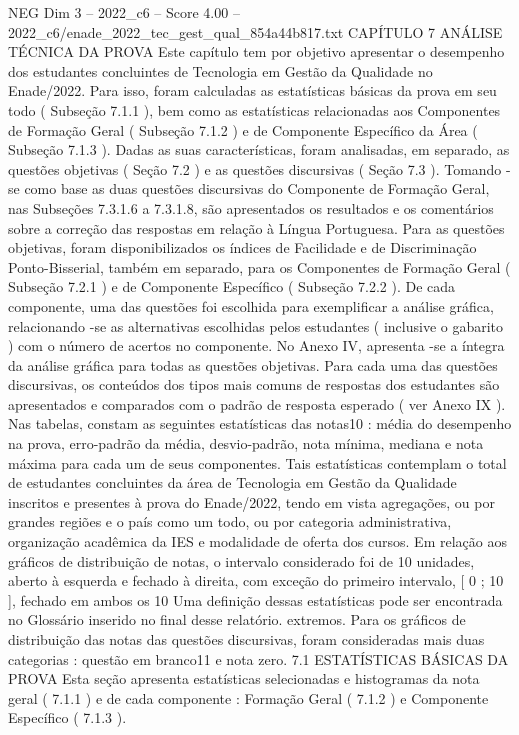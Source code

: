 \begin{textsample}{NEG Dim 3 – 2022\_c6 – Score 4.00 – 2022\_c6/enade\_2022\_tec\_gest\_qual\_854a44b817.txt}  \label{ex:f3_neg_256}
CAPÍTULO 7 ANÁLISE TÉCNICA DA PROVA Este capítulo tem por objetivo apresentar o desempenho dos estudantes concluintes de Tecnologia em Gestão da Qualidade no Enade/2022.
Para isso, foram calculadas as estatísticas básicas da prova em seu todo ( Subseção 7.1.1 ), bem como as estatísticas relacionadas aos Componentes de Formação Geral ( Subseção 7.1.2 ) e de Componente Específico da Área ( Subseção 7.1.3 ).
Dadas as suas características, foram analisadas, em separado, as questões objetivas ( Seção 7.2 ) e as questões discursivas ( Seção 7.3 ).
Tomando -se como base as duas questões discursivas do Componente de Formação Geral, nas Subseções 7.3.1.6 a 7.3.1.8, são apresentados os resultados e os comentários sobre a correção das respostas em relação à Língua Portuguesa.
Para as questões objetivas, foram disponibilizados os índices de Facilidade e de Discriminação Ponto-Bisserial, também em separado, para os Componentes de Formação Geral ( Subseção 7.2.1 ) e de Componente Específico ( Subseção 7.2.2 ).
De cada componente, uma das questões foi escolhida para exemplificar a análise gráfica, relacionando -se as alternativas escolhidas pelos estudantes ( inclusive o gabarito ) com o número de acertos no componente.
No Anexo IV, apresenta -se a íntegra da análise gráfica para todas as questões objetivas.
Para cada uma das questões discursivas, os conteúdos dos tipos mais comuns de respostas dos estudantes são apresentados e comparados com o padrão de resposta esperado ( ver Anexo IX ).
Nas tabelas, constam as seguintes estatísticas das notas10 : média do desempenho na prova, erro-padrão da média, desvio-padrão, nota mínima, mediana e nota máxima para cada um de seus componentes.
Tais estatísticas contemplam o total de estudantes concluintes da área de Tecnologia em Gestão da Qualidade inscritos e presentes à prova do Enade/2022, tendo em vista agregações, ou por grandes regiões e o país como um todo, ou por categoria administrativa, organização acadêmica da IES e modalidade de oferta dos cursos.
Em relação aos gráficos de distribuição de notas, o intervalo considerado foi de 10 unidades, aberto à esquerda e fechado à direita, com exceção do primeiro intervalo, [ 0 ; 10 ], fechado em ambos os 10 Uma definição dessas estatísticas pode ser encontrada no Glossário inserido no final desse relatório. extremos.
Para os gráficos de distribuição das notas das questões discursivas, foram consideradas mais duas categorias : questão em branco11 e nota zero. 7.1 ESTATÍSTICAS BÁSICAS DA PROVA Esta seção apresenta estatísticas selecionadas e histogramas da nota geral ( 7.1.1 ) e de cada componente : Formação Geral ( 7.1.2 ) e Componente Específico ( 7.1.3 ).

\end{textsample}
